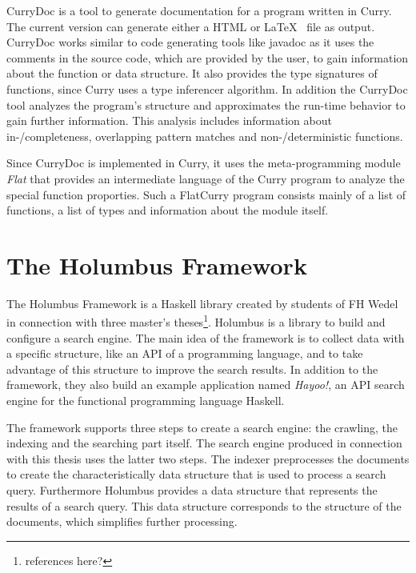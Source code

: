 \documentclass[%
	pdftex,%
	a4paper,%
	oneside,%
	chapterprefix,%
	headsepline,%
	12pt%
]{scrbook}
\begin{document}
CurryDoc is a tool to generate documentation for a program written in
Curry. %
The current version can generate either a HTML or \LaTeX~ file as
output. %
CurryDoc works similar to code generating tools like
javadoc\cite{javadoc} as it uses the comments in the source code,
which are provided by the user, to gain information about the function
or data structure. %
It also provides the type signatures of functions, since Curry uses a
type inferencer algorithm. %
In addition the CurryDoc tool analyzes the program's structure and
approximates the run-time behavior to gain further
information\cite{currydoc2}. %
This analysis includes information about in-/completeness, overlapping
pattern matches and non-/deterministic functions. %

Since CurryDoc is implemented in Curry, it uses the meta-programming
module \emph{Flat}\cite{flat2} that provides an intermediate language
of the Curry program to analyze the special function proporties. %
Such a FlatCurry\cite{flat} program consists mainly of a list of
functions, a list of types and information about the module itself. %


\section{The Holumbus Framework}\label{preliminaries:holumbus}
The Holumbus Framework is a Haskell library created by students of FH
Wedel in connection with three master's theses\footnote{references
  here?}. %
Holumbus is a library to build and configure a search engine. %
The main idea of the framework is to collect data with a specific
structure, like an API of a programming language, and to take
advantage of this structure to improve the search results. %
In addition to the framework, they also build an example application
named \emph{Hayoo!}\cite{hayoo}, an API search engine for the
functional programming language Haskell. %

The framework supports three steps to create a search engine: the
crawling, the indexing and the searching part itself. %
The search engine produced in connection with this thesis uses the
latter two steps. %
The indexer preprocesses the documents to create the
characteristically data structure that is used to process a search
query. %
Furthermore Holumbus provides a data structure that represents the
results of a search query. %
This data structure corresponds to the structure of the documents,
which simplifies further processing. %
\end{document}
